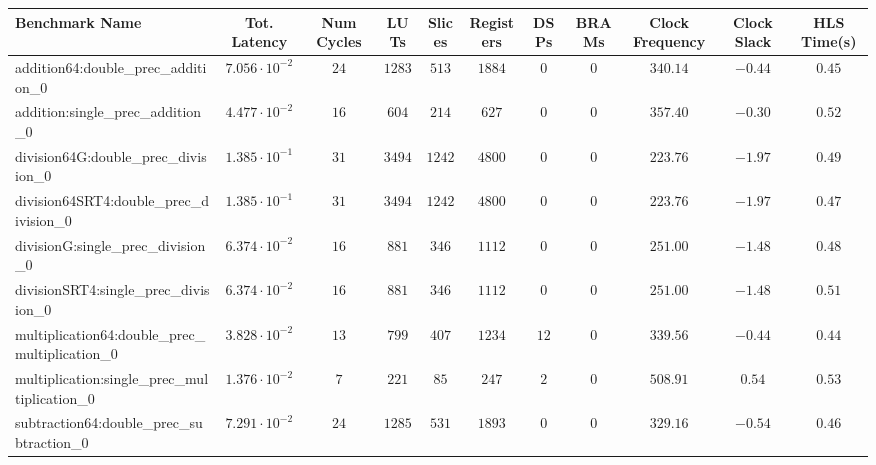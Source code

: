 \begin{tabular}{|l|c|c|c|c|c|c|c|c|c|c|}
\hline
Benchmark Name                                   & Tot. Latency            & Num Cycles & LUTs      & Slices   & Registers & DSPs   & BRAMs & Clock Frequency & Clock Slack & HLS Time(s) \\
\hline
addition64:double\_prec\_addition\_0             & $ 7.056 \cdot 10^{-2} $ & $ 24     $ & $ 1283  $ & $ 513  $ & $ 1884  $ & $ 0  $ & $ 0 $ & $ 340.14      $ & $ -0.44   $ & $ 0.45    $ \\
addition:single\_prec\_addition\_0               & $ 4.477 \cdot 10^{-2} $ & $ 16     $ & $ 604   $ & $ 214  $ & $ 627   $ & $ 0  $ & $ 0 $ & $ 357.40      $ & $ -0.30   $ & $ 0.52    $ \\
division64G:double\_prec\_division\_0            & $ 1.385 \cdot 10^{-1} $ & $ 31     $ & $ 3494  $ & $ 1242 $ & $ 4800  $ & $ 0  $ & $ 0 $ & $ 223.76      $ & $ -1.97   $ & $ 0.49    $ \\
division64SRT4:double\_prec\_division\_0         & $ 1.385 \cdot 10^{-1} $ & $ 31     $ & $ 3494  $ & $ 1242 $ & $ 4800  $ & $ 0  $ & $ 0 $ & $ 223.76      $ & $ -1.97   $ & $ 0.47    $ \\
divisionG:single\_prec\_division\_0              & $ 6.374 \cdot 10^{-2} $ & $ 16     $ & $ 881   $ & $ 346  $ & $ 1112  $ & $ 0  $ & $ 0 $ & $ 251.00      $ & $ -1.48   $ & $ 0.48    $ \\
divisionSRT4:single\_prec\_division\_0           & $ 6.374 \cdot 10^{-2} $ & $ 16     $ & $ 881   $ & $ 346  $ & $ 1112  $ & $ 0  $ & $ 0 $ & $ 251.00      $ & $ -1.48   $ & $ 0.51    $ \\
multiplication64:double\_prec\_multiplication\_0 & $ 3.828 \cdot 10^{-2} $ & $ 13     $ & $ 799   $ & $ 407  $ & $ 1234  $ & $ 12 $ & $ 0 $ & $ 339.56      $ & $ -0.44   $ & $ 0.44    $ \\
multiplication:single\_prec\_multiplication\_0   & $ 1.376 \cdot 10^{-2} $ & $ 7      $ & $ 221   $ & $ 85   $ & $ 247   $ & $ 2  $ & $ 0 $ & $ 508.91      $ & $ 0.54    $ & $ 0.53    $ \\
subtraction64:double\_prec\_subtraction\_0       & $ 7.291 \cdot 10^{-2} $ & $ 24     $ & $ 1285  $ & $ 531  $ & $ 1893  $ & $ 0  $ & $ 0 $ & $ 329.16      $ & $ -0.54   $ & $ 0.46    $ \\

\end{tabular}
